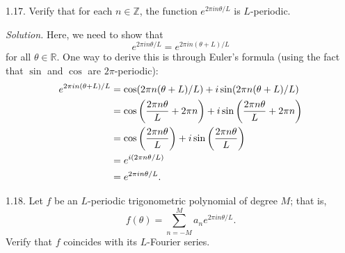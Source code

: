 \documentclass{article}
\newcommand{\R}{\mathbb{R}}
\newcommand{\Z}{\mathbb{Z}}
\begin{document}
\newpage

1.17. Verify that for each $n \in \Z$, the function
  $e^{2 \pi i n \theta / L}$ is $L$-periodic.

\textit{Solution.} Here, we need to show that
%
\begin{equation*}
    e^{2 \pi i n \theta / L} = e^{2 \pi i n (\theta + L) / L}
\end{equation*}
%
for all $\theta \in \R$. One way to derive this is through Euler's
formula (using the fact that $\sin$ and $\cos$ are $2 \pi$-periodic):
%
\begin{align*}
    e^{2 \pi i n (\theta + L) / L}
    &=
    \cos(2 \pi n (\theta + L) / L)
    + i \sin(2 \pi n (\theta + L) / L)
    \\
    &=
    \cos\del{\frac{2 \pi n \theta}{L} + 2 \pi n}
    + i \sin\del{\frac{2 \pi n \theta}{L} + 2 \pi n}
    \\
    &=
    \cos\del{\frac{2 \pi n \theta}{L}}
    + i \sin\del{\frac{2 \pi n \theta}{L}}
    \\
    &=
    e^{i (2 \pi n \theta / L)}
    \\
    &=
    e^{2 \pi i n \theta / L}
    .
\end{align*}

\newpage

1.18. Let $f$ be an $L$-periodic trigonometric polynomial of degree $M$;
  that is,
%
\begin{equation*}
    f(\theta) = \sum_{n = - M}^M a_n e^{2 \pi i n \theta / L}
    .
\end{equation*}
%
Verify that $f$ coincides with its $L$-Fourier series.
\end{document}
